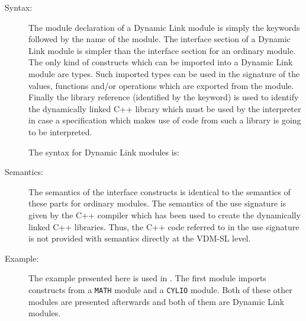 \documentclass[\pformat,12pt]{article}
\begin{document}
\begin{description}
\item[Syntax:]
  
The module declaration of a Dynamic Link module is simply the keywords
 followed by the name of the module. The interface
section of a Dynamic Link module is simpler than the interface section
for an ordinary module. The only kind of constructs which
can be imported into a Dynamic Link module are types. Such imported types can
be used in the signature of the values, functions and/or operations
which are exported from the module. Finally the library reference
(identified by the  keyword) is
used to identify the dynamically linked C++ library which must be
used by the interpreter in case a specification
which makes use of code from such a library is going to be interpreted.

The syntax for Dynamic Link modules is:
 





  

  
\item[Semantics:] The semantics of the interface constructs is
     identical to the semantics of these parts for ordinary
     modules. The semantics of the use signature is given by the C++
     compiler which has been used to create the dynamically linked C++
     libraries. Thus, the C++ code referred to in the use signature is
     not provided with semantics directly at the VDM-SL level.
\item[Example:] The example presented here is used in
\cite{DLMan-SCSK}. The first module imports constructs from a {\tt MATH}
module and a {\tt CYLIO} module. Both of these other modules are
presented afterwards and both of them are Dynamic Link modules.


\end{description}
\end{document}
